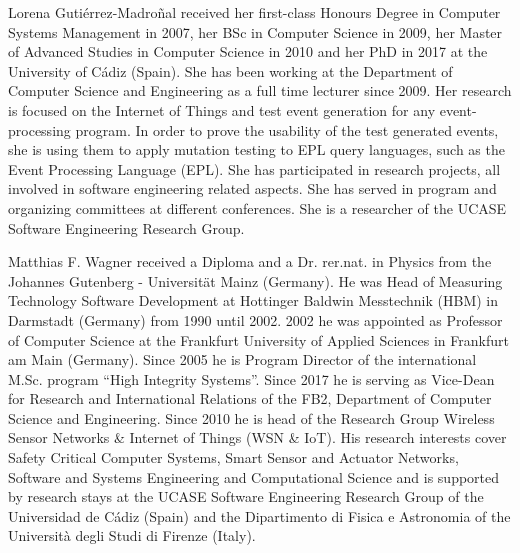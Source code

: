 \documentclass[10pt,journal,compsoc]{IEEEtran}
\begin{document}
\begin{IEEEbiography}{Lorena Gutiérrez-Madroñal}
	received her first-class Honours Degree in Computer Systems Management in 2007, her BSc in Computer Science in 2009, her Master of Advanced Studies in Computer Science in 2010 and her PhD in 2017 at the University of Cádiz (Spain). She has been working at the Department of Computer Science and Engineering as a full time lecturer since 2009. Her research is focused on the Internet of Things and test event generation for any event-processing program. In order to prove the usability of the test generated events, she is using them to apply mutation testing to EPL query languages, such as the Event Processing Language (EPL). She has participated in research projects, all involved in software engineering related aspects. She has served in program and organizing committees at different conferences. She is a researcher of the UCASE Software Engineering Research Group. 
\end{IEEEbiography}

\vfill

\begin{IEEEbiography}{Matthias F. Wagner}
	 received a Diploma and a Dr. rer.nat. in Physics from the Johannes Gutenberg - Universität Mainz (Germany). He was Head of Measuring Technology Software Development at Hottinger Baldwin Messtechnik (HBM) in Darmstadt (Germany) from 1990 until 2002. 2002 he was appointed as Professor of Computer Science at the Frankfurt University of Applied Sciences in Frankfurt am Main (Germany). Since 2005 he is Program Director of the international M.Sc. program “High Integrity Systems”. Since 2017 he is serving as Vice-Dean for Research and International Relations of the FB2, Department of Computer Science and Engineering. Since 2010 he is head of the Research Group Wireless Sensor Networks \& Internet of Things (WSN \& IoT). His research interests cover Safety Critical Computer Systems, Smart Sensor and Actuator Networks, Software and Systems Engineering and Computational Science and is supported by research stays at the UCASE Software Engineering Research Group of the Universidad de Cádiz (Spain) and the Dipartimento di Fisica e Astronomia of the Università degli Studi di Firenze (Italy). 
\end{IEEEbiography}
\end{document}
